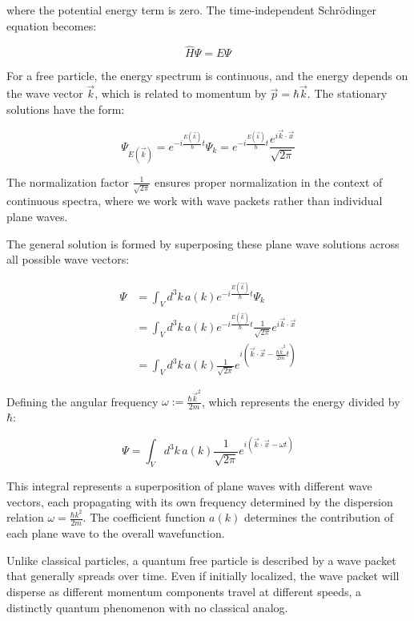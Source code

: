 \documentclass[italian]{HKNdocument}
\begin{document}
where the potential energy term is zero. The time-independent Schrödinger equation becomes:

\begin{equation}
\hat{H}\Psi = E\Psi
\end{equation}

For a free particle, the energy spectrum is continuous, and the energy depends on the wave vector $\vec{k}$, which is related to momentum by $\vec{p} = \hbar\vec{k}$. The stationary solutions have the form:

\begin{equation}
\Psi_{E(\vec{k})} = e^{-i\frac{E(\vec{k})}{\hbar}t}\Psi_k = e^{-i\frac{E(\vec{k})}{\hbar}t}\frac{e^{i\vec{k}\cdot\vec{x}}}{\sqrt{2\pi}}
\end{equation}

The normalization factor $\frac{1}{\sqrt{2\pi}}$ ensures proper normalization in the context of continuous spectra, where we work with wave packets rather than individual plane waves.

The general solution is formed by superposing these plane wave solutions across all possible wave vectors:

\begin{align}
\Psi &= \int_V d^3k\,a(k)e^{-i\frac{E(\vec{k})}{\hbar}t}\Psi_k \\
&= \int_V d^3k\,a(k)e^{-i\frac{E(\vec{k})}{\hbar}t}\frac{1}{\sqrt{2\pi}}e^{i\vec{k}\cdot\vec{x}}  \\
&= \int_V d^3k\,a(k)\frac{1}{\sqrt{2\pi}}e^{i\left(\vec{k}\cdot\vec{x} - \frac{\hbar\vec{k}^2}{2m}t\right)}
\end{align}

Defining the angular frequency $\omega := \frac{\hbar\vec{k}^2}{2m}$, which represents the energy divided by $\hbar$:

\begin{equation}
\Psi = \int_V d^3k\,a(k)\frac{1}{\sqrt{2\pi}}e^{i(\vec{k}\cdot\vec{x} - \omega t)} \label{eq:3.6}
\end{equation}

This integral represents a superposition of plane waves with different wave vectors, each propagating with its own frequency determined by the dispersion relation $\omega = \frac{\hbar k^2}{2m}$. The coefficient function $a(k)$ determines the contribution of each plane wave to the overall wavefunction.

Unlike classical particles, a quantum free particle is described by a wave packet that generally spreads over time. Even if initially localized, the wave packet will disperse as different momentum components travel at different speeds, a distinctly quantum phenomenon with no classical analog.
\end{document}
